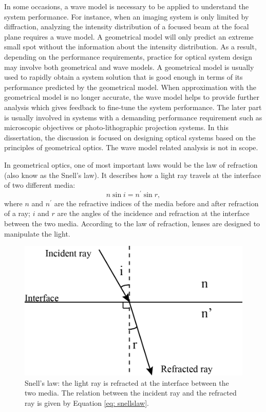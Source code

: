  
In some occasions, a wave model is necessary to be applied to understand the system performance. For instance, when an imaging system is only limited by diffraction, analyzing the intensity distribution of a focused beam at the focal plane requires a wave model. A geometrical model will only predict an extreme small spot without the information about the intensity distribution. As a result, depending on the performance requirements, practice for optical system design may involve both geometrical and wave models. A geometrical model is usually used to rapidly obtain a system solution that is good enough in terms of its performance predicted by the geometrical model. When approximation with the geometrical model is no longer accurate, the wave model helps to provide further analysis which gives feedback to fine-tune the system performance. The later part is usually involved in systems with a demanding performance requirement such as microscopic objectives or photo-lithographic projection systems. In this dissertation, the discussion is focused on designing optical systems based on the principles of geometrical optics. The wave model related analysis is not in scope.  


In geometrical optics, one of most important laws would be the law of refraction (also know as the Snell's law). It describes how a light ray travels at the interface of two different media:
\begin{equation}
n \sin i = n^\prime \sin r,
\label{eq: snellslaw}
\end{equation}
where $n$ and $n^\prime$ are the refractive indices of the media before and after refraction of a ray; $i$ and $r$ are the angles of the incidence and refraction at the interface between the two media. According to the law of refraction, lenses are designed to manipulate the light.
\begin{figure}[h]
    \centering
    \setlength{\belowcaptionskip}{-2pt}
    \includegraphics[scale=0.65]{chapter-1/figures/snellslaw.png}
    \caption{Snell's law: the light ray is refracted at the interface between the two media. The relation between the incident ray and the refracted ray is given by Equation \ref{eq: snellslaw}.}
    \label{fig: snellslaw}
\end{figure} 

